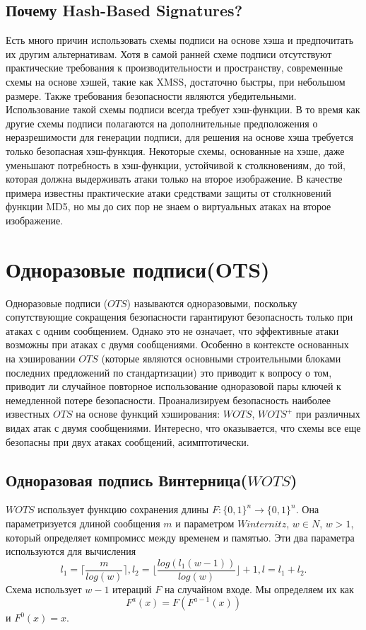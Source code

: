 \documentclass[a4paper, 14pt]{extarticle}
\begin{document}
\subsection{Почему Hash-Based Signatures?}
Есть много причин использовать схемы подписи на основе хэша и предпочитать их другим альтернативам. Хотя в самой ранней схеме подписи отсутствуют практические требования к производительности и пространству, современные схемы на основе хэшей, такие как XMSS, достаточно быстры, при небольшом размере. Также требования безопасности являются убедительными. Использование такой схемы подписи всегда требует хэш-функции. В то время как другие схемы подписи полагаются на дополнительные предположения о неразрешимости для генерации подписи, для решения на основе хэша требуется только безопасная хэш-функция. Некоторые схемы, основанные на хэше, даже уменьшают потребность в хэш-функции, устойчивой к столкновениям, до той, которая должна выдерживать атаки только на второе изображение. В качестве примера известны практические атаки средствами защиты от столкновений функции MD5, но мы до сих пор не знаем о виртуальных атаках на второе изображение.
\newpage

\section{Одноразовые подписи(OTS)}
Одноразовые подписи ($OTS$) называются одноразовыми, поскольку сопутствующие сокращения безопасности гарантируют безопасность только при атаках с одним сообщением. Однако это не означает, что эффективные атаки возможны при атаках с двумя сообщениями. Особенно в контексте основанных на хэшировании $OTS$ (которые являются основными строительными блоками последних предложений по стандартизации) это приводит к вопросу о том, приводит ли случайное повторное использование одноразовой пары ключей к немедленной потере безопасности. Проанализируем безопасность наиболее известных $OTS$ на основе функций хэширования: $WOTS$, $WOTS^{+}$ при различных видах атак с двумя сообщениями. Интересно, что оказывается, что схемы все еще безопасны при двух атаках сообщений, асимптотически.
\subsection{Одноразовая подпись Винтерница($WOTS$)}
$WOTS$ использует функцию сохранения длины $F : \{0, 1\}^{n} \rightarrow \{0, 1\}^{n}$. Она параметризуется длиной сообщения $m$ и параметром $Winternitz$, $w \in N$, $w > 1$, который определяет компромисс между временем и памятью. Эти два параметра используются для вычисления
\[ l_{1} = \Bigg \lceil \frac{m}{log(w)} \Bigg \rceil, l_{2} = \Bigg \lfloor \frac{log(l_{1}(w - 1))}{log(w)} \Bigg \rfloor + 1, l = l_{1} + l_{2}. \]
Схема использует $w - 1$ итераций $F$ на случайном входе. Мы определяем их как
\[ F^{a}(x) = F(F^{a - 1}(x)) \]
и $F^{0}(x) = x$.
\newline
\end{document}

